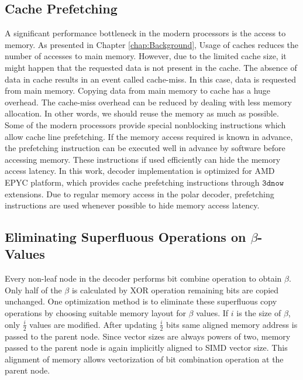 \subsection{Cache Prefetching}
A significant performance bottleneck in the modern processors is the access to memory. As presented in Chapter \ref{chap:Background}, Usage of caches reduces the number of accesses to main memory. However, due to the limited cache size, it might happen that the requested data is not present in the cache. The absence of data in cache results in an event called cache-miss. In this case, data is requested from main memory. Copying data from main memory to cache has a huge overhead.  The cache-miss overhead can be reduced by dealing with less memory allocation. In other words, we should reuse the memory as much as possible. Some of the modern processors provide special nonblocking instructions which allow cache line prefetching. If the memory access required is known in advance, the prefetching instruction can be executed well in advance by software before accessing memory. These instructions if used efficiently can hide the memory access latency. In this work, decoder implementation is optimized for AMD EPYC platform, which provides cache prefetching instructions through $ \mathtt{3dnow} $ extensions. Due to regular memory access in the polar decoder, prefetching instructions are used whenever possible to hide memory access latency.

\subsection {Eliminating Superfluous Operations on $\beta$-Values}
Every non-leaf node in the decoder performs bit combine operation to obtain $\beta$. Only half of the $\beta$ is calculated by XOR operation remaining bits are copied unchanged. One optimization method is to eliminate these superfluous copy operations by choosing suitable memory layout for $\beta$ values. If $i$ is the size of $\beta$, only $\frac{i}{2}$ values are modified. After updating $\frac{i}{2}$ bits same aligned memory address is passed to the parent node. Since vector sizes are always powers of two, memory passed to the parent node is again implicitly aligned to SIMD vector size. This alignment of memory allows vectorization of bit combination operation at the parent node.

